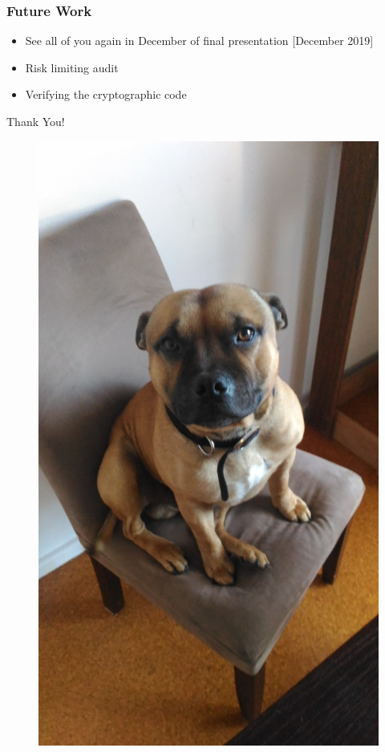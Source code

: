 \documentclass{beamer}
\begin{document}
\begin{frame}
\frametitle{Future Work}
\begin{itemize}
\item See all of you again in December of final presentation [December 2019]
\item Risk limiting audit
\item Verifying the cryptographic code
\end{itemize}

\end{frame}

\begin{frame}
\begin{center}
{\fontsize{40}{50}\selectfont Thank You!}
\begin{figure}
	\begin{center}
	\includegraphics[scale=0.05]{turbo.jpg}
	\end{center}
  \end{figure}
\end{center}
\end{frame}
\end{document}
